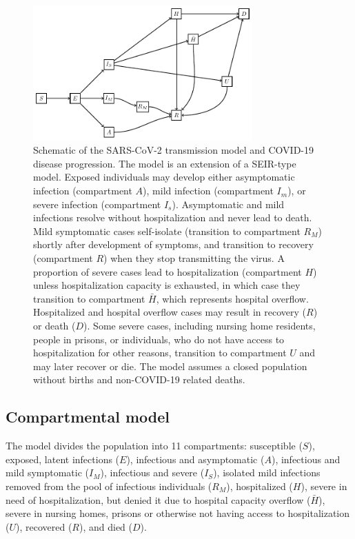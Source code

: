 \documentclass[11pt]{article}
\begin{document}
\begin{figure}
	\begin{center}
		\includegraphics[width=0.75\textwidth]{model_diagram_ct.pdf}
	\end{center}
	\caption{Schematic of the SARS-CoV-2 transmission model and COVID-19 disease progression.  
		The model is an extension of a SEIR-type model. Exposed individuals may develop either asymptomatic infection (compartment $A$), mild infection (compartment $I_m$), or severe infection (compartment $I_s$). Asymptomatic and mild infections resolve without hospitalization and never lead to death. Mild symptomatic cases self-isolate (transition to compartment $R_M$) shortly after development of symptoms, and transition to recovery (compartment $R$) when they stop transmitting the virus. A proportion of severe cases lead to hospitalization (compartment $H$) unless hospitalization capacity is exhausted, in which case they transition to compartment $\bar{H}$, which represents hospital overflow. Hospitalized and hospital overflow cases may result in recovery ($R$) or death ($D$). Some severe cases, including nursing home residents, people in prisons, or individuals, who do not have access to hospitalization for other reasons, transition to compartment $U$ and may later recover or die. The model assumes a closed population without births and non-COVID-19 related deaths. }
	\label{fig:model}
\end{figure}




\subsection{Compartmental model}

The model divides the population into 11 compartments: susceptible ($S$), exposed, latent infections ($E$), infectious and asymptomatic ($A$), infectious and mild symptomatic ($I_M$), infectious and severe ($I_S$), isolated mild infections removed from the pool of infectious individuals ($R_M$), hospitalized ($H$), severe in need of hospitalization, but denied it due to hospital capacity overflow ($\bar{H}$), severe in nursing homes, prisons or otherwise not having access to hospitalization ($U$), recovered ($R$), and died ($D$).  
\end{document}
